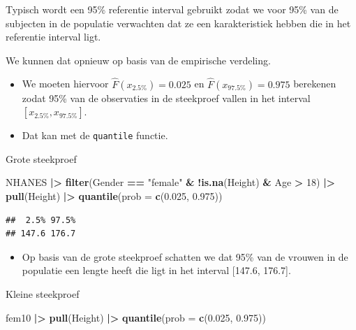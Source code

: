 \documentclass[
  12pt,dutch]{book}
\newenvironment{Shaded}{\begin{snugshade}}{\end{snugshade}}
\newcommand{\AttributeTok}[1]{\textcolor[rgb]{0.13,0.29,0.53}{#1}}
\newcommand{\DecValTok}[1]{\textcolor[rgb]{0.00,0.00,0.81}{#1}}
\newcommand{\FloatTok}[1]{\textcolor[rgb]{0.00,0.00,0.81}{#1}}
\newcommand{\FunctionTok}[1]{\textcolor[rgb]{0.13,0.29,0.53}{\textbf{#1}}}
\newcommand{\NormalTok}[1]{#1}
\newcommand{\SpecialCharTok}[1]{\textcolor[rgb]{0.81,0.36,0.00}{\textbf{#1}}}
\newcommand{\StringTok}[1]{\textcolor[rgb]{0.31,0.60,0.02}{#1}}
\providecommand{\tightlist}{%
  \setlength{\itemsep}{0pt}\setlength{\parskip}{0pt}}
\theoremstyle{definition}
\theoremstyle{definition}
\theoremstyle{definition}
\theoremstyle{definition}
\theoremstyle{remark}
\begin{document}
Typisch wordt een 95\% referentie interval gebruikt zodat we voor 95\% van de subjecten in de populatie verwachten dat ze een karakteristiek hebben die in het referentie interval ligt.

We kunnen dat opnieuw op basis van de empirische verdeling.

\begin{itemize}
\item
  We moeten hiervoor \(\hat{F}(x_{2.5\%})=0.025\) en \(\hat{F}(x_{97.5\%})=0.975\) berekenen zodat 95\% van de observaties in de steekproef vallen in het interval \([x_{2.5\%},x_{97.5\%}]\).
\item
  Dat kan met de \texttt{quantile} functie.
\end{itemize}

Grote steekproef

\begin{Shaded}
\begin{Highlighting}[]
\NormalTok{NHANES }\SpecialCharTok{|\textgreater{}}
    \FunctionTok{filter}\NormalTok{(Gender }\SpecialCharTok{==} \StringTok{"female"} \SpecialCharTok{\&} \SpecialCharTok{!}\FunctionTok{is.na}\NormalTok{(Height) }\SpecialCharTok{\&}\NormalTok{ Age }\SpecialCharTok{\textgreater{}}
        \DecValTok{18}\NormalTok{) }\SpecialCharTok{|\textgreater{}}
    \FunctionTok{pull}\NormalTok{(Height) }\SpecialCharTok{|\textgreater{}}
    \FunctionTok{quantile}\NormalTok{(}\AttributeTok{prob =} \FunctionTok{c}\NormalTok{(}\FloatTok{0.025}\NormalTok{, }\FloatTok{0.975}\NormalTok{))}
\end{Highlighting}
\end{Shaded}

\begin{verbatim}
##  2.5% 97.5% 
## 147.6 176.7
\end{verbatim}

\begin{itemize}
\tightlist
\item
  Op basis van de grote steekproef schatten we dat 95\% van de vrouwen in de populatie een lengte heeft die ligt in het interval {[}147.6, 176.7{]}.
\end{itemize}

Kleine steekproef

\begin{Shaded}
\begin{Highlighting}[]
\NormalTok{fem10 }\SpecialCharTok{|\textgreater{}}
    \FunctionTok{pull}\NormalTok{(Height) }\SpecialCharTok{|\textgreater{}}
    \FunctionTok{quantile}\NormalTok{(}\AttributeTok{prob =} \FunctionTok{c}\NormalTok{(}\FloatTok{0.025}\NormalTok{, }\FloatTok{0.975}\NormalTok{))}
\end{Highlighting}
\end{Shaded}
\end{document}
